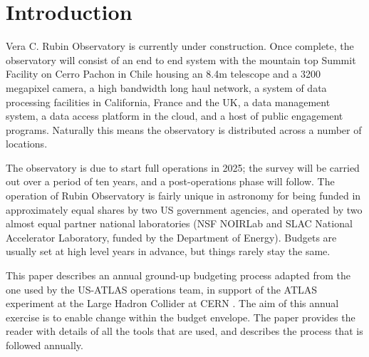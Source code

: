 \section{Introduction} \label{sec:intro}
Vera C. Rubin Observatory\cite{2008arXiv0805.2366I} is currently under construction.
Once complete, the observatory will consist of an end to end system with the mountain top Summit Facility on Cerro Pachon in Chile housing an 8.4m telescope and a 3200 megapixel camera, a high bandwidth long haul network, a system of data processing facilities in California, France and the UK, a data management system, a data access platform in the cloud, and a host of public engagement programs.
Naturally this means the observatory is distributed across a number of locations.

The observatory is due to start full operations in 2025; the survey will be carried out over a period of ten years, and a post-operations phase will follow.
The operation of Rubin Observatory is fairly unique in astronomy for being funded in approximately equal shares by two US government agencies, and operated by two almost equal partner national laboratories (NSF NOIRLab and SLAC National Accelerator Laboratory, funded by the Department of Energy).
Budgets are usually set at high level years in advance, but things rarely stay the same.

This paper describes an annual ground-up budgeting process adapted from the one used by the US-ATLAS operations team, in support of the ATLAS experiment at the Large Hadron Collider at CERN \cite{US-ATLAS,Srini}.
The aim of this annual exercise is to enable change within the budget envelope.
The paper provides the reader with details of all the tools that are used, and describes the process that is followed annually.
